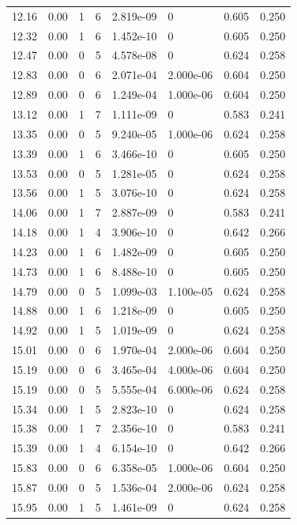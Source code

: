 \documentclass[preview]{standalone}
\begin{document}
{{{\begin{tabular}{L{1.2cm}C{1.2cm} C{0.3cm}C{0.5cm} C{1.4cm}C{1.4cm} C{1.4cm}C{1.4cm}}
  12.16  &  0.00  & 1     &  6 &  2.819e-09  & 0  & 0.605 &  0.250   \\ 
  12.32  &  0.00  & 1     &  6 &  1.452e-10  & 0  & 0.605 &  0.250   \\ 
  12.47  &  0.00  & 0     &  5 &  4.578e-08  & 0  & 0.624 &  0.258   \\ 
  12.83  &  0.00  & 0     &  6 &  2.071e-04  & 2.000e-06  & 0.604 &  0.250   \\ 
  12.89  &  0.00  & 0     &  6 &  1.249e-04  & 1.000e-06  & 0.604 &  0.250   \\ 
  13.12  &  0.00  & 1     &  7 &  1.111e-09  & 0  & 0.583 &  0.241   \\ 
  13.35  &  0.00  & 0     &  5 &  9.240e-05  & 1.000e-06  & 0.624 &  0.258   \\ 
  13.39  &  0.00  & 1     &  6 &  3.466e-10  & 0  & 0.605 &  0.250   \\ 
  13.53  &  0.00  & 0     &  5 &  1.281e-05  & 0  & 0.624 &  0.258   \\ 
  13.56  &  0.00  & 1     &  5 &  3.076e-10  & 0  & 0.624 &  0.258   \\ 
  14.06  &  0.00  & 1     &  7 &  2.887e-09  & 0  & 0.583 &  0.241   \\ 
  14.18  &  0.00  & 1     &  4 &  3.906e-10  & 0  & 0.642 &  0.266   \\ 
  14.23  &  0.00  & 1     &  6 &  1.482e-09  & 0  & 0.605 &  0.250   \\ 
  14.73  &  0.00  & 1     &  6 &  8.488e-10  & 0  & 0.605 &  0.250   \\ 
  14.79  &  0.00  & 0     &  5 &  1.099e-03  & 1.100e-05  & 0.624 &  0.258   \\ 
  14.88  &  0.00  & 1     &  6 &  1.218e-09  & 0  & 0.605 &  0.250   \\ 
  14.92  &  0.00  & 1     &  5 &  1.019e-09  & 0  & 0.624 &  0.258   \\ 
  15.01  &  0.00  & 0     &  6 &  1.970e-04  & 2.000e-06  & 0.604 &  0.250   \\ 
  15.19  &  0.00  & 0     &  6 &  3.465e-04  & 4.000e-06  & 0.604 &  0.250   \\ 
  15.19  &  0.00  & 0     &  5 &  5.555e-04  & 6.000e-06  & 0.624 &  0.258   \\ 
  15.34  &  0.00  & 1     &  5 &  2.823e-10  & 0  & 0.624 &  0.258   \\ 
  15.38  &  0.00  & 1     &  7 &  2.356e-10  & 0  & 0.583 &  0.241   \\ 
  15.39  &  0.00  & 1     &  4 &  6.154e-10  & 0  & 0.642 &  0.266   \\ 
  15.83  &  0.00  & 0     &  6 &  6.358e-05  & 1.000e-06  & 0.604 &  0.250   \\ 
  15.87  &  0.00  & 0     &  5 &  1.536e-04  & 2.000e-06  & 0.624 &  0.258   \\ 
  15.95  &  0.00  & 1     &  5 &  1.461e-09  & 0  & 0.624 &  0.258   \\ 
\hline 
\end{tabular} 

}}}
\end{document}
